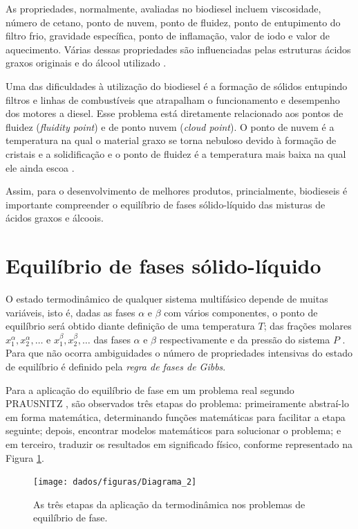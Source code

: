 As propriedades, normalmente, avaliadas no biodiesel incluem viscosidade, número de cetano, ponto de nuvem, ponto de fluidez, ponto de entupimento do filtro frio, gravidade específica, ponto de inflamação, valor de iodo e valor de aquecimento. Várias dessas propriedades são influenciadas pelas estruturas ácidos graxos originais e do álcool utilizado \cite{Hoekman2012,Knothe2005}.

Uma das dificuldades à utilização do biodiesel é a formação de sólidos entupindo filtros e linhas de combustíveis que atrapalham o funcionamento e desempenho dos motores a diesel. Esse problema está diretamente relacionado aos pontos de fluidez (\textit{fluidity point}) e de ponto nuvem (\textit{cloud point}). O ponto de nuvem é a temperatura na qual o material graxo se torna nebuloso devido à formação de cristais e a solidificação e o ponto de fluidez é a temperatura mais baixa na qual ele ainda escoa \cite{Knothe2005}. 

Assim, para o desenvolvimento de melhores produtos, princialmente, biodieseis é importante compreender o equilíbrio de fases sólido-líquido das misturas de ácidos graxos e álcoois.

\section{Equilíbrio de fases sólido-líquido}
	
O estado termodinâmico de qualquer sistema multifásico depende de muitas variáveis, isto é, dadas as fases $\alpha$ e $\beta$ com vários componentes, o ponto de equilíbrio será obtido diante definição de uma temperatura $T$; das frações molares $x_{1}^{\alpha}, x_{2}^{\alpha}, \ldots$ e $x_{1}^{\beta}, x_{2}^{\beta}, \ldots$ das fases $\alpha$ e $\beta$ respectivamente e da pressão do sistema $P$ . Para que não ocorra ambiguidades o número de propriedades intensivas do estado de equilíbrio é definido pela \textit{regra de fases de Gibbs}. \cite{Prausnitz}
	
	
Para a aplicação do equilíbrio de fase em um problema real segundo PRAUSNITZ \citeyear{Prausnitz}, são observados três etapas do problema: primeiramente abstraí-lo em forma matemática, determinando funções matemáticas para facilitar a etapa seguinte; depois, encontrar modelos matemáticos para solucionar o problema; e em terceiro, traduzir os resultados em significado físico, conforme  representado na Figura \ref{fig:diagrama2}.
	\begin{figure}[H]
		\centering
		\texttt{[image: dados/figuras/Diagrama\_2]}
		\caption[As três etapas da aplicação da termodinâmica nos problemas de equilíbrio de fase]{As três etapas da aplicação da termodinâmica nos problemas de equilíbrio de fase.\cite{Prausnitz}}
		\label{fig:diagrama2}
	\end{figure}
	
